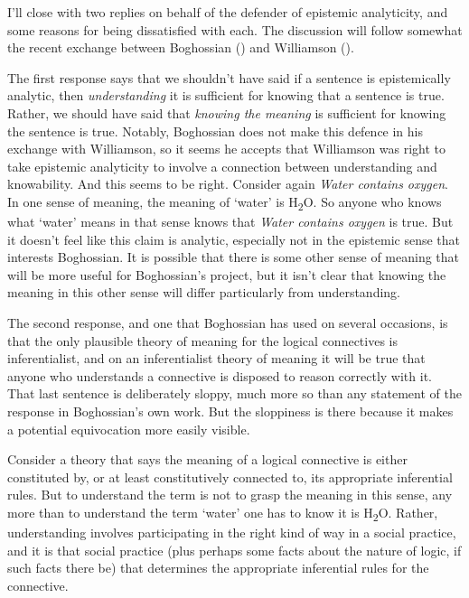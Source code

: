 \documentclass[
  11pt,
  letterpaper,
  DIV=11,
  numbers=noendperiod,
  twoside]{scrartcl}
\begin{document}
I'll close with two replies on behalf of the defender of epistemic
analyticity, and some reasons for being dissatisfied with each. The
discussion will follow somewhat the recent exchange between Boghossian
() and Williamson
().

The first response says that we shouldn't have said if a sentence is
epistemically analytic, then \emph{understanding} it is sufficient for
knowing that a sentence is true. Rather, we should have said that
\emph{knowing the meaning} is sufficient for knowing the sentence is
true. Notably, Boghossian does not make this defence in his exchange
with Williamson, so it seems he accepts that Williamson was right to
take epistemic analyticity to involve a connection between understanding
and knowability. And this seems to be right. Consider again \emph{Water
contains oxygen}. In one sense of meaning, the meaning of `water' is
H\textsubscript{2}O. So anyone who knows what `water' means in that
sense knows that \emph{Water contains oxygen} is true. But it doesn't
feel like this claim is analytic, especially not in the epistemic sense
that interests Boghossian. It is possible that there is some other sense
of meaning that will be more useful for Boghossian's project, but it
isn't clear that knowing the meaning in this other sense will differ
particularly from understanding.

The second response, and one that Boghossian has used on several
occasions, is that the only plausible theory of meaning for the logical
connectives is inferentialist, and on an inferentialist theory of
meaning it will be true that anyone who understands a connective is
disposed to reason correctly with it. That last sentence is deliberately
sloppy, much more so than any statement of the response in Boghossian's
own work. But the sloppiness is there because it makes a potential
equivocation more easily visible.

Consider a theory that says the meaning of a logical connective is
either constituted by, or at least constitutively connected to, its
appropriate inferential rules. But to understand the term is not to
grasp the meaning in this sense, any more than to understand the term
`water' one has to know it is H\textsubscript{2}O. Rather, understanding
involves participating in the right kind of way in a social practice,
and it is that social practice (plus perhaps some facts about the nature
of logic, if such facts there be) that determines the appropriate
inferential rules for the connective.
\end{document}
